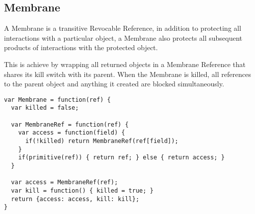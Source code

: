 \documentclass[a4paper]{article}
\begin{document}


\subsection{Membrane}
\label{sec:membrane}
A Membrane is a transitive Revocable Reference, in addition to protecting all
interactions with a particular object, a Membrane also protects all subsequent
products of interactions with the protected object.

This is achieve by wrapping all returned objects in a Membrane Reference that
shares its kill switch with its parent. When the Membrane is killed, all
references to the parent object and anything it created are blocked
simultaneously.

\begin{verbatim}
var Membrane = function(ref) {
  var killed = false;

  var MembraneRef = function(ref) {
    var access = function(field) {
      if(!killed) return MembraneRef(ref[field]);
    }
    if(primitive(ref)) { return ref; } else { return access; }
  }

  var access = MembraneRef(ref);
  var kill = function() { killed = true; }
  return {access: access, kill: kill};
}
\end{verbatim}
\end{document}
